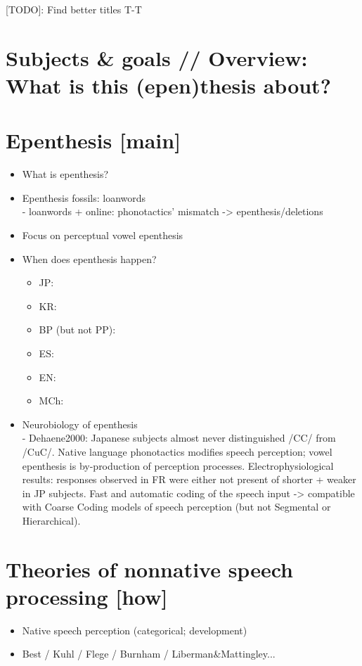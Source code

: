 {\color{red}[TODO]: Find better titles T-T}

\section{Subjects \& goals // Overview: What is this (epen)thesis about?}

\section{Epenthesis [main]}

\begin{itemize}
\item What is epenthesis?
\item Epenthesis fossils: loanwords \\
  - loanwords + online: phonotactics' mismatch -> epenthesis/deletions
\item Focus on perceptual vowel epenthesis
\item When does epenthesis happen?
  \begin{itemize}
  \item JP:
  \item KR:
  \item BP (but not PP):
  \item ES:
  \item EN:
  \item MCh:
  \end{itemize}
  
\item Neurobiology of epenthesis \\
  - Dehaene2000: Japanese subjects almost never distinguished /CC/ from /CuC/. Native language phonotactics modifies speech perception; vowel epenthesis is by-production of perception processes. Electrophysiological results: responses observed in FR were either not present of shorter + weaker in JP subjects. Fast and automatic coding of the speech input -> compatible with Coarse Coding models of speech perception (but not Segmental or Hierarchical). 

\end{itemize}

\section{Theories of nonnative speech processing [how]}

\begin{itemize}
\item Native speech perception (categorical; development)
\item Best / Kuhl / Flege / Burnham / Liberman\&Mattingley...
\end{itemize}


